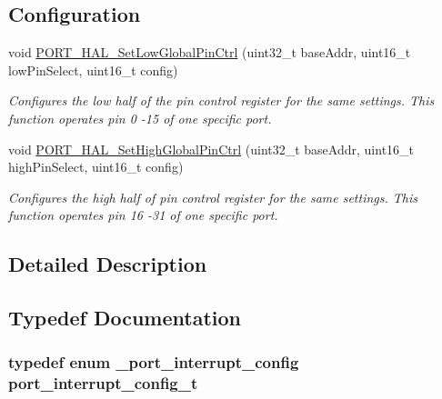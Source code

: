 \subsection*{Configuration}
\begin{DoxyCompactItemize}
\item 
void \hyperlink{group__port__hal_ga217884d95f48519cd02e755910f5ad99}{P\+O\+R\+T\+\_\+\+H\+A\+L\+\_\+\+Set\+Low\+Global\+Pin\+Ctrl} (uint32\+\_\+t base\+Addr, uint16\+\_\+t low\+Pin\+Select, uint16\+\_\+t config)
\begin{DoxyCompactList}\small\item\em Configures the low half of the pin control register for the same settings. This function operates pin 0 -\/15 of one specific port. \end{DoxyCompactList}\item 
void \hyperlink{group__port__hal_ga841592ec1c8be69d1417317c7b4d1dda}{P\+O\+R\+T\+\_\+\+H\+A\+L\+\_\+\+Set\+High\+Global\+Pin\+Ctrl} (uint32\+\_\+t base\+Addr, uint16\+\_\+t high\+Pin\+Select, uint16\+\_\+t config)
\begin{DoxyCompactList}\small\item\em Configures the high half of pin control register for the same settings. This function operates pin 16 -\/31 of one specific port. \end{DoxyCompactList}\end{DoxyCompactItemize}


\subsection{Detailed Description}


\subsection{Typedef Documentation}
\subsubsection[{\texorpdfstring{port\+\_\+interrupt\+\_\+config\+\_\+t}{port_interrupt_config_t}}]{\setlength{\rightskip}{0pt plus 5cm}typedef enum {\bf \+\_\+port\+\_\+interrupt\+\_\+config}  {\bf port\+\_\+interrupt\+\_\+config\+\_\+t}}\hypertarget{group__port__hal_ga54da044f13951cd799e647eafb825536}{}\label{group__port__hal_ga54da044f13951cd799e647eafb825536}


